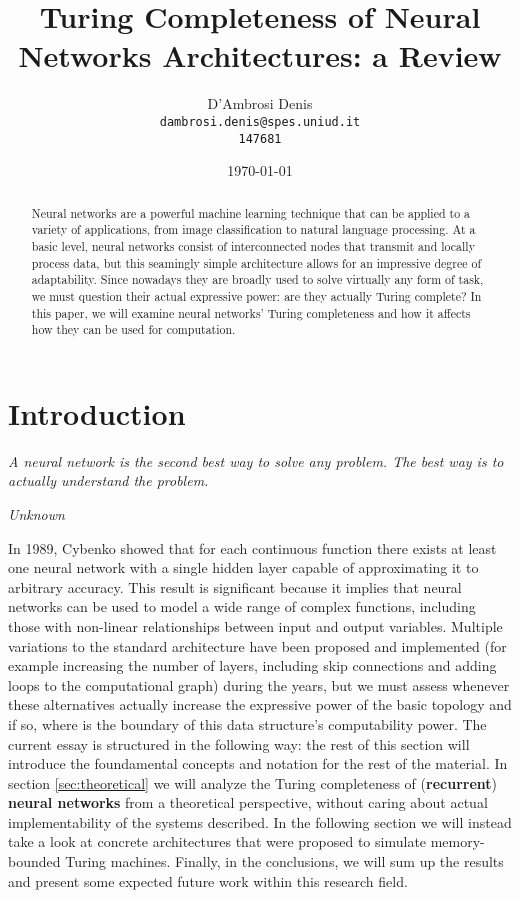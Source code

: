 \documentclass{article}
\title{Turing Completeness of Neural Networks Architectures: a Review}
\author{D'Ambrosi Denis \\ \small \texttt{dambrosi.denis@spes.uniud.it} \\ \small \texttt{147681}}
\date{\today}
\begin{document}
\maketitle

\begin{abstract}
    Neural networks are a powerful machine learning technique that can be applied to a variety of applications, from image classification to natural language processing. At a basic level, neural networks consist of interconnected nodes that transmit and locally process data, but this seamingly simple architecture allows for an impressive degree of adaptability. Since nowadays they are broadly used to solve virtually any form of task, we must question their actual expressive power: are they actually Turing complete?
    In this paper, we will examine neural networks' Turing completeness and how it affects how they can be used for computation.
\end{abstract}

\tableofcontents

\newpage

\section{Introduction}

\epigraph{\textit{A neural network is the second best way to solve any problem. The best way is to actually understand the problem.}}{\textit{Unknown}}

In 1989, Cybenko \cite{CYB89} showed that for each continuous function there exists at least one neural network with a single hidden layer capable of approximating it to arbitrary accuracy. This result is significant because it implies that neural networks can be used to model a wide range of complex functions, including those with non-linear relationships between input and output variables. 
Multiple variations to the standard architecture have been proposed and implemented (for example increasing the number of layers, including skip connections and adding loops to the computational graph) during the years, but we must assess whenever these alternatives actually increase the expressive power of the basic topology and if so, where is the boundary of this data structure's computability power.
The current essay is structured in the following way: the rest of this section will introduce the foundamental concepts and notation for the rest of the material. In section \ref{sec:theoretical} we will analyze the Turing completeness of (\textbf{recurrent}) \textbf{neural networks} from a theoretical perspective, without caring about actual implementability of the systems described. In the following section we will instead take a look at concrete architectures that were proposed to simulate memory-bounded Turing machines. Finally, in the conclusions, we will sum up the results and present some expected future work within this research field.
\end{document}
